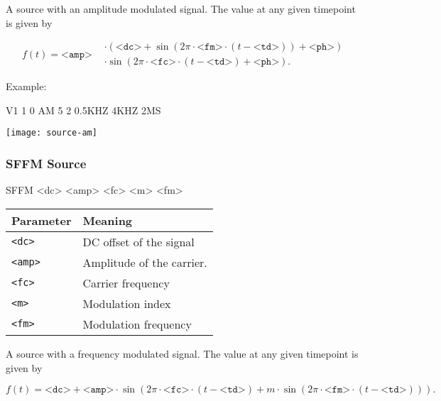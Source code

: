 \pagebreak
A source with an amplitude modulated signal. The value at any given timepoint is given by

\[
f(t) = \texttt{<amp>} \begin{aligned}
&\cdot \left( \texttt{<dc>}  + \sin{
	\left(
	2\pi \cdot \texttt{<fm>} \cdot  \left(t - \texttt{<td>}\right)
	\right)} + \texttt{<ph>} \right) 
\\
&\cdot \sin{
	\left(
	2\pi \cdot \texttt{<fc>} \cdot  \left(t - \texttt{<td>} \right) + \texttt{<ph>}
	\right)}.
\end{aligned} 
\]

Example:

\begin{code}
V1 1 0 AM 5 2 0.5KHZ 4KHZ 2MS
\end{code}

\begin{center}
	\texttt{[image: source-am]}
\end{center}

\subsubsection*{SFFM Source}
\begin{code}
SFFM <dc> <amp> <fc> <m> <fm>
\end{code}

\begin{center}
	\begin{tabular}{|l|l|}
		\hline
		Parameter & Meaning \\ \hline \hline
		\texttt{<dc>} & DC offset of the signal \\ \hline
		\texttt{<amp>} & Amplitude of the carrier. \\ \hline
		\texttt{<fc>} & Carrier frequency \\ \hline
		\texttt{<m>} & Modulation index \\ \hline
		\texttt{<fm>} & Modulation frequency \\ \hline
	\end{tabular}
\end{center}

A source with a frequency modulated signal. The value at any given timepoint is given by

\[
f(t) = \texttt{<dc>} + \texttt{<amp>} \cdot \sin{
	\left(
	2\pi \cdot \texttt{<fc>} \cdot  \left(t - \texttt{<td>}\right) + m \cdot \sin{
		\left(
		2\pi \cdot \texttt{<fm>} \cdot  \left(t - \texttt{<td>}\right)
		\right)}
	\right)}.
\]

